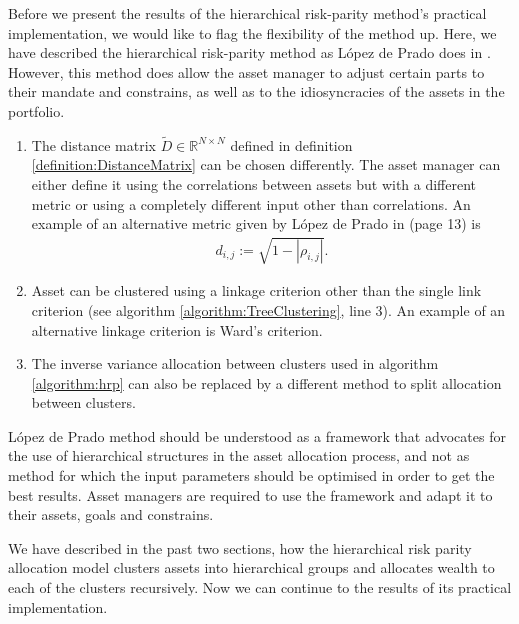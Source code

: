         Before we present the results of the hierarchical risk-parity method's practical implementation, we would like to flag the flexibility of the method up. Here, we have described the hierarchical risk-parity method as López de Prado does in \cite{lopezmain}. However, this method does allow the asset manager to adjust certain parts to their mandate and constrains, as well as to the idiosyncracies of the assets in the portfolio.
        \begin{enumerate}
            \item The distance matrix $\tilde{D} \in \mathbb{R}^{N \times N}$ defined in definition \ref{definition:DistanceMatrix} can be chosen differently. The asset manager can either define it using the correlations between assets but with a different metric or using a completely different input other than correlations. An example of an alternative metric given by López de Prado in \cite{lopezmain} (page 13) is
            \begin{align*}
                d_{i,j} := \sqrt{1- \left| \rho_{i,j} \right|}.
            \end{align*}
            \item Asset can be clustered using a linkage criterion other than the single link criterion (see algorithm \ref{algorithm:TreeClustering}, line 3). An example of an alternative linkage criterion is Ward's criterion.
            \item The inverse variance allocation between clusters used in algorithm \ref{algorithm:hrp} can also be replaced by a different method to split allocation between clusters.
        \end{enumerate}
        
        López de Prado method should be understood as a framework that advocates for the use of hierarchical structures in the asset allocation process, and not as method for which the input parameters should be optimised in order to get the best results. Asset managers are required to use the framework and adapt it to their assets, goals and constrains.
        
        We have described in the past two sections, how the hierarchical risk parity allocation model clusters assets into hierarchical groups and allocates wealth to each of the clusters recursively. Now we can continue to the results of its practical implementation.
    
    
